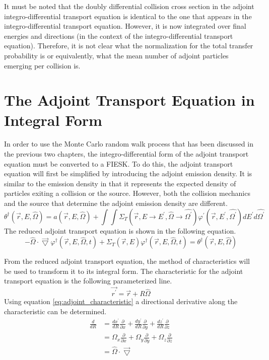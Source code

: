 It must be noted that the doubly differential collision cross section in the
adjoint integro-differential transport equation is identical to the one that
appears in the integro-differential transport equation. However, it is now
integrated over final energies and directions (in the context of the 
integro-differential transport equation). Therefore, it is not clear what the 
normalization for the total transfer probability is or equivalently, what the
mean number of adjoint particles emerging per collision is. 

\section{The Adjoint Transport Equation in Integral Form}
In order to use the Monte Carlo random walk process that has been discussed
in the previous two chapters, the integro-differential form of the adjoint
transport equation must be converted to a FIESK. To do this, the adjoint
transport equation will first be simplified by introducing the adjoint emission
density. It is similar to the emission density in that it represents the 
expected density of particles exiting a collision or the source. However, both
the collision mechanics and the source that determine the adjoint emission 
density are different.
\begin{equation}
  \theta^{\dagger}(\vec{r},E,\hat{\Omega}) = a(\vec{r},E,\hat{\Omega}) +
  \int\int \Sigma_T(\vec{r},E \to E^{'},\hat{\Omega} \to \hat{\Omega^{'}})
  \varphi^{'}(\vec{r},E^{'},\hat{\Omega^{'}}) dE^{'}d\hat{\Omega^{'}}
  \label{eq:adjoint_emission_density}
\end{equation}
The reduced adjoint transport equation is shown in the following equation.
\begin{equation}
  -\hat{\Omega} \cdot \vec{\bigtriangledown} 
    \varphi^{\dagger}(\vec{r},E,\hat{\Omega},t)
    + \Sigma_T(\vec{r},E) \varphi^{\dagger}(\vec{r},E,\hat{\Omega},t) =
    \theta^{\dagger}(\vec{r},E,\hat{\Omega})
\end{equation}
  
From the reduced adjoint transport equation, the method of characteristics will
be used to transform it to its integral form. The characteristic for the 
adjoint transport equation is the following parameterized line.
\begin{equation}
  \vec{r^{'}} = \vec{r} + R\hat{\Omega}
  \label{eq:adjoint_characteristic}
\end{equation}
Using equation \ref{eq:adjoint_characteristic} a directional derivative along
the characteristic can be determined.
\begin{align}
  \frac{d}{dR} & = \frac{dx^{'}}{dR}\frac{\partial}{\partial x} +
  \frac{dy^{'}}{dR}\frac{\partial}{\partial y} +
  \frac{dz^{'}}{dR}\frac{\partial}{\partial z} \nonumber \\
  & = \Omega_x \frac{\partial}{\partial x} +
  \Omega_y \frac{\partial}{\partial y} +
  \Omega_z \frac{\partial}{\partial z} \nonumber \\
  & = \hat{\Omega} \cdot \vec{\bigtriangledown}
\end{align}

